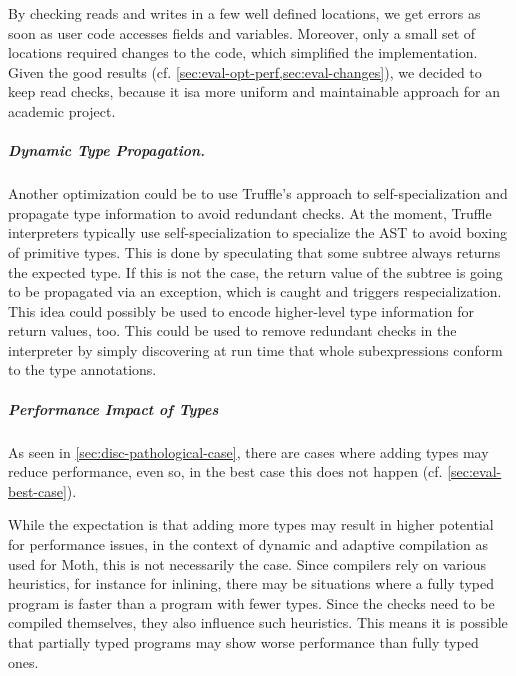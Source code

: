 By checking reads and writes in a few well defined locations,
we get errors as soon as user code accesses fields and variables.
Moreover, only a small set of locations required changes to the code,
which simplified the implementation.
Given the good
results (cf. \cref{sec:eval-opt-perf,sec:eval-changes}), we decided to keep read checks, because it isa more uniform and maintainable
approach for an academic project.


\subparagraph{Dynamic Type Propagation.}
Another optimization could be to use Truffle's approach to 
self-specialization\citep{Wurthinger:2012:SelfOptAST}
and propagate type information to avoid redundant checks.
At the moment, Truffle interpreters typically use self-specialization to 
specialize the AST to avoid boxing of primitive types.
This is done by speculating that some subtree always returns the expected type.
If this is not the case, the return value of the subtree is going to be
propagated via an exception, which is caught and triggers respecialization.
This idea could possibly be used to encode higher-level type information for
return values, too.
This could be used to remove redundant checks in the interpreter
by simply discovering at run time that whole subexpressions conform to the
type annotations.

\subparagraph{Performance Impact of Types}

As seen in \cref{sec:disc-pathological-case},
there are cases where adding types may reduce performance,
even so, in the best case this does not happen (cf. \cref{sec:eval-best-case}).

While the expectation is that adding more types may result in higher potential
for performance issues, in the context of dynamic and adaptive compilation
as used for Moth, this is not necessarily the case.
Since compilers rely on various heuristics, for instance for inlining,
there may be situations where a fully typed program is faster than
a program with fewer types.
Since the checks need to be compiled themselves, they also influence such heuristics.
This means it is possible that
partially typed programs may show worse performance than fully typed ones.

